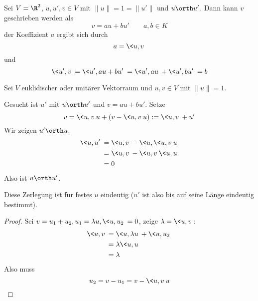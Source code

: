 \documentclass{mycourse}
\begin{document}
\begin{ex}
	Sei $V=\R^2$, $u,u',v\in V$ mit $\|u\|=1=\|u'\|$ und $u\orth u'$.
	Dann kann $v$ geschrieben werden als
	\[
		v = au + bu' \qquad a,b\in K
	\]
	der Koeffizient $a$ ergibt sich durch
	\[
		a = \<u,v\>
	\]
	und
	\[
		\<u',v\> = \<u',au+bu'\> = \<u',au\> + \<u',bu'\> = b
	\]
\end{ex}

\begin{ex}
	Sei $V$ euklidischer oder unitärer Vektorraum und $u,v\in V$ mit $\|u\| = 1$.

	Gesucht ist $u'$ mit $u\orth u'$ und $v = au + bu'$.
	Setze
	\[
		v = \<u,v\>u + (v-\<u,v\> u) := \<u,v\> + u'
	\]
	Wir zeigen $u'\orth u$.
	\begin{align*}
		\<u, u'\> &= \<u,v\> - \<u,\<u,v\>u\>\\
				  &= \<u,v\> -\<u,v\>\<u,u\>\\
			&= 0
	\end{align*}
	Also ist $u\orth u'$.

	Diese Zerlegung ist für festes $u$ eindeutig ($u'$ ist also bis auf seine Länge eindeutig bestimmt).
	\begin{proof}
		Sei $v= u_1 + u_2, u_1 = \lambda u, \<u,u_2\> = 0$, zeige $\lambda = \<u,v\>$:
		\begin{align*}
			\<u,v\> &= \<u,\lambda u\> + \<u,u_2\>\\
					&= \lambda \<u,u\> \\
			  &= \lambda
		\end{align*}
		Also muss
		\[
			u_2 = v - u_1 = v - \<u,v\> u
		\]
	\end{proof}
\end{ex}
\end{document}
